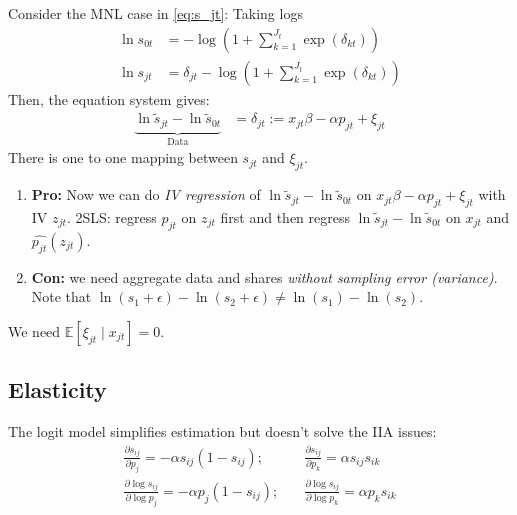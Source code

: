 \documentclass[11pt]{elegantbook}
\begin{document}
\begin{example}
    Consider the MNL case in \eqref{eq:s_jt}:
    Taking logs
    \begin{equation}
        \begin{aligned}
            \ln s_{0t}&=-\log\left(1+\sum_{k=1}^{J_t}\exp(\delta_{kt})\right)\\
            \ln s_{jt}&=\delta_{jt}-\log\left(1+\sum_{k=1}^{J_t}\exp(\delta_{kt})\right)
        \end{aligned}
        \nonumber
    \end{equation}
    Then, the equation system gives:
    \begin{equation}
        \begin{aligned}
            \underbrace{\ln \tilde{s}_{jt}-\ln \tilde{s}_{0t}}_\text{Data}&=\delta_{jt}:= x_{jt}\beta-\alpha p_{jt}+\xi_{jt}
        \end{aligned}
        \nonumber
    \end{equation}
    There is one to one mapping between $s_{jt}$ and $\xi_{jt}$.
    \begin{enumerate}
        \item \textbf{Pro:} Now we can do \textit{IV regression} of $\ln \tilde{s}_{jt}-\ln \tilde{s}_{0t}$ on $x_{jt}\beta-\alpha p_{jt}+\xi_{jt}$ with IV $z_{jt}$. 2SLS: regress $p_{jt}$ on $z_{jt}$ first and then regress $\ln \tilde{s}_{jt}-\ln \tilde{s}_{0t}$ on $x_{jt}$ and $\hat{p_{jt}}(z_{jt})$.
        \item \textbf{Con:} we need aggregate data and shares \textit{without sampling error (variance)}. Note that $\ln(s_1+\epsilon)-\ln(s_2+\epsilon)\neq \ln(s_1)-\ln(s_2)$.
    \end{enumerate}
    \begin{note}
        We need $\mathbb{E}[\xi_{jt}\mid x_{jt}]=0$.
    \end{note}
\end{example}


\subsection{Elasticity}
The logit model simplifies estimation but doesn't solve the IIA issues:
\begin{equation}
    \begin{aligned}
        \frac{\partial s_{ij}}{\partial p_j}
        =-\alpha s_{ij}(1-s_{ij});&\quad
        \frac{\partial s_{ij}}{\partial p_k}=\alpha s_{ij}s_{ik}\\
        \frac{\partial \log s_{ij}}{\partial \log p_j}=-\alpha p_j (1-s_{ij});&\quad \frac{\partial \log s_{ij}}{\partial \log p_k}=\alpha p_k s_{ik}
    \end{aligned}
    \nonumber
\end{equation}
\end{document}
